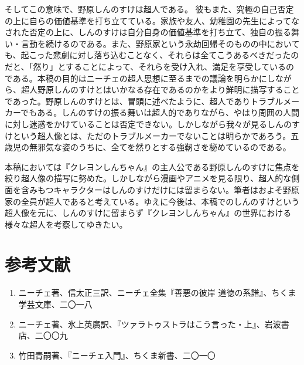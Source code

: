 \documentclass[b5j,twoside,twocolumn]{utarticle}
\begin{document}
そしてこの意味で、野原しんのすけは超人である。
彼もまた、究極の自己否定の上に自らの価値基準を打ち立てている。家族や友人、幼稚園の先生によってなされた否定の上に、しんのすけは自分自身の価値基準を打ち立て、独自の振る舞い・言動を続けるのである。また、野原家という永劫回帰そのものの中においても、起こった悲劇に対し落ち込むことなく、それらは全てこうあるべきだったのだと、「然り」とすることによって、それらを受け入れ、満足を享受しているのである。本稿の目的はニーチェの超人思想に至るまでの議論を明らかにしながら、超人野原しんのすけとはいかなる存在であるのかをより鮮明に描写することであった。野原しんのすけとは、冒頭に述べたように、超人でありトラブルメーカーでもある。しんのすけの振る舞いは超人的でありながら、やはり周囲の人間に対し迷惑をかけていることは否定できない。しかしながら我々が見るしんのすけという超人像とは、ただのトラブルメーカーでないことは明らかであろう。五歳児の無邪気な姿のうちに、全てを然りとする強靭さを秘めているのである。


本稿においては『クレヨンしんちゃん』の主人公である野原しんのすけに焦点を絞り超人像の描写に努めた。しかしながら漫画やアニメを見る限り、超人的な側面を含みもつキャラクターはしんのすけだけには留まらない。筆者はおよそ野原家の全員が超人であると考えている。ゆえに今後は、本稿でのしんのすけという超人像を元に、しんのすけに留まらず『クレヨンしんちゃん』の世界における様々な超人を考察してゆきたい。

\section*{参考文献}
{\small
\renewcommand{\labelenumi}{\pbox<y>{[\arabic{enumi}]}}
\begin{enumerate}
\item ニーチェ著、信太正三訳、ニーチェ全集『善悪の彼岸 道徳の系譜』、ちくま学芸文庫、二〇一八
\item ニーチェ著、氷上英廣訳、『ツァラトゥストラはこう言った・上』、岩波書店、二〇〇九
\item 竹田青嗣著、『ニーチェ入門』、ちくま新書、二〇一〇
\end{enumerate}
}
\end{document}

